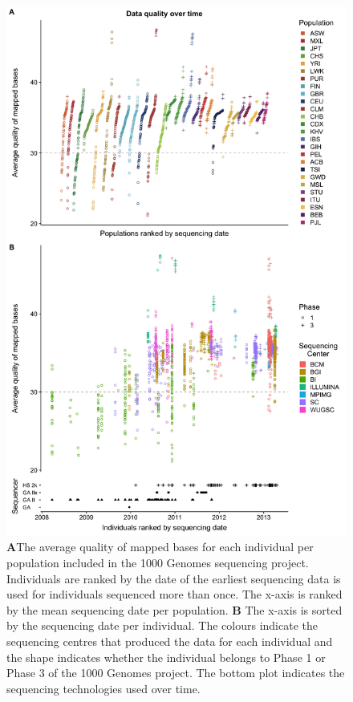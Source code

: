 \documentclass[9pt,lineno]{elife}
\begin{document}
\begin{figure}
\includegraphics[width=\hsize,keepaspectratio]{./Figures/MapQualOverTime.jpg}

\caption{\textbf{A}The average quality of mapped bases for each individual per population included in the 1000 Genomes sequencing project. Individuals are ranked by the date of the earliest sequencing data is used for individuals sequenced more than once. The x-axis is ranked by the mean sequencing date per population. \textbf{B} The x-axis is sorted by the sequencing date per individual. The colours indicate the sequencing centres that produced the data for each individual and the shape indicates whether the individual belongs to Phase 1 or Phase 3 of the 1000 Genomes project. The bottom plot indicates the sequencing technologies used over time.}
\label{MapQual}
\end{figure}
\end{document}
